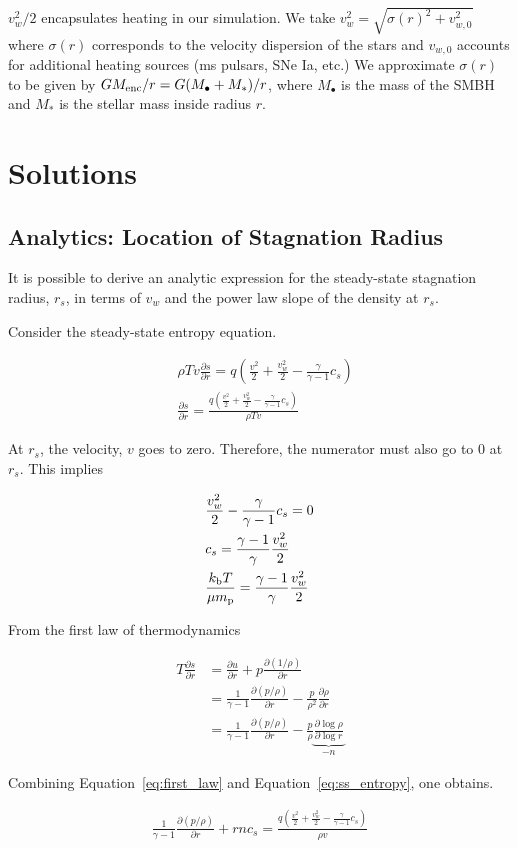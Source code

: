 \documentclass[usenatbib,fleqn]{mn2e}
\newcommand{\rs}{r_s}
\newcommand{\cs}{c_s}
\newcommand{\dxdy}[2]{\frac{\partial #1}{\partial #2} }
\newcommand{\ddr}[1]{\dxdy{#1}{r}}
\newcommand{\dsdr}{\dxdy{s}{r}}
\newcommand{\ke}{\frac{v^2}{2}}
\newcommand{\kew}{\frac{v_w^2}{2}}
\newcommand{\gammaf}{\frac{\gamma}{\gamma-1}}
\newcommand{\gammafi}{\frac{\gamma-1}{\gamma}}
\newcommand{\cs}{\frac{p}{\rho}}
\newcommand{\Q}{q (\ke+\kew-\gammaf \cs)}
\newcommand{\kb}{k_{\rm b}}
\renewcommand{\mp}{m_{\rm p}}
\newcommand{\Menc}{M_{\rm enc}}
\newcommand{\Mstar}{M_{*}}
\newcommand{\Mbh}[1][]{M_{\bullet#1}}
\begin{document}
$v_w^2/2$ encapsulates heating in our simulation. We take $v_w^2=\sqrt{\sigma(r)^2+v_{w,0}^2}$ where $\sigma(r)$ corresponds to the velocity dispersion of the stars and $v_{w,0}$ accounts for additional heating sources (ms pulsars, SNe Ia, etc.)  We approximate $\sigma(r)$ to be given by $G \Menc/r=G(\Mbh+\Mstar)/r$, where $\Mbh$ is the mass of the SMBH and $\Mstar$ is the stellar mass inside radius $r$. 

\section{Solutions}
\subsection{Analytics: Location of Stagnation Radius}
It is possible to derive an analytic expression for the steady-state stagnation radius, $\rs$, in terms of $v_w$ and the power law slope of the density at $\rs$.

Consider the steady-state entropy equation.

\begin{align}
&\rho T v \dsdr=\Q\\
&\dsdr=\frac{\Q}{\rho T v} \label{eq:ss_entropy}
\end{align}

At $\rs$, the velocity, $v$ goes to zero.  Therefore, the numerator must also go to 0 at $\rs$. This implies 

\begin{align}
 &\kew-\gammaf \cs=0\\
 &\cs=\gammafi \kew\\
 &\frac{\kb T}{\mu \mp}=\gammafi \kew \label{eq:tstag}
\end{align}

From the first law of thermodynamics 

\begin{align}
T\dsdr&=\ddr{u}+p\ddr{(1/\rho)}\\
&=\frac{1}{\gamma-1}\ddr{(p/\rho)}-\frac{p}{\rho^2}\ddr{\rho}\\
&=\frac{1}{\gamma-1}\ddr{(p/\rho)}-\frac{p}{\rho} \underbrace{\dxdy{\log{\rho}}{\log{r}}}_{-n} \label{eq:first_law}
\end{align}

Combining Equation~\ref{eq:first_law} and Equation~\ref{eq:ss_entropy}, one obtains.

\begin{align}
\frac{1}{\gamma-1}\ddr{(p/\rho)}+r n \cs=\frac{\Q}{\rho  v} \label{eqn:combo1}
\end{align}
\end{document}
